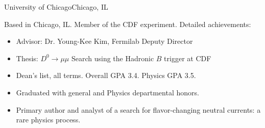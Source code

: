  {University of Chicago}{Chicago, IL}{}{Based in Chicago, IL.  Member of the CDF experiment. \newline{}%
  Detailed achievements:
  \begin{itemize}
  \item Advisor: Dr. Young-Kee Kim, Fermilab Deputy Director
  \item Thesis: $D^0\rightarrow\mu\mu$ Search using the Hadronic $B$ trigger at CDF
  \item Dean's list, all terms. Overall GPA 3.4.  Physics GPA 3.5.
  \item Graduated with general and Physics departmental honors.
  \item Primary author and analyst of a search for flavor-changing neutral currents: a rare physics process.
  \end{itemize}
}
